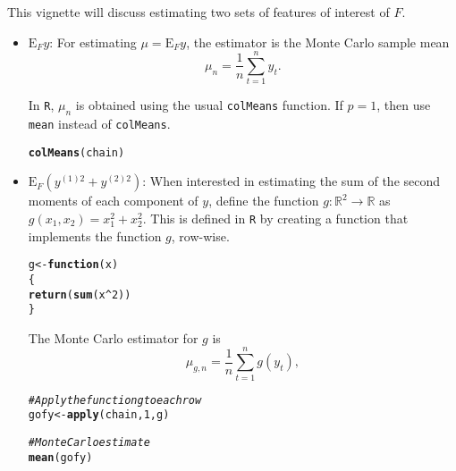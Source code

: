\documentclass[11pt]{article}\usepackage[]{graphicx}\usepackage[]{color}
\makeatletter
\newcommand{\hlnum}[1]{\textcolor[rgb]{0.686,0.059,0.569}{#1}}%
\newcommand{\hlcom}[1]{\textcolor[rgb]{0.678,0.584,0.686}{\textit{#1}}}%
\newcommand{\hlopt}[1]{\textcolor[rgb]{0,0,0}{#1}}%
\newcommand{\hlstd}[1]{\textcolor[rgb]{0.345,0.345,0.345}{#1}}%
\newcommand{\hlkwa}[1]{\textcolor[rgb]{0.161,0.373,0.58}{\textbf{#1}}}%
\newcommand{\hlkwb}[1]{\textcolor[rgb]{0.69,0.353,0.396}{#1}}%
\newcommand{\hlkwc}[1]{\textcolor[rgb]{0.333,0.667,0.333}{#1}}%
\newcommand{\hlkwd}[1]{\textcolor[rgb]{0.737,0.353,0.396}{\textbf{#1}}}%
\newenvironment{kframe}{%
 \def\at@end@of@kframe{}%
 \ifinner\ifhmode%
  \def\at@end@of@kframe{\end{minipage}}%
  \begin{minipage}{\columnwidth}%
 \fi\fi%
 \def\FrameCommand##1{\hskip\@totalleftmargin \hskip-\fboxsep
 \colorbox{shadecolor}{##1}\hskip-\fboxsep
     \hskip-\linewidth \hskip-\@totalleftmargin \hskip\columnwidth}%
 \MakeFramed {\advance\hsize-\width
   \@totalleftmargin\z@ \linewidth\hsize
   \@setminipage}}%
 {\par\unskip\endMakeFramed%
 \at@end@of@kframe}
\newenvironment{knitrout}{}{} %
\makeatother
\begin{document}
\bigskip
This vignette will discuss estimating two sets of features of interest of $F$.
\begin{itemize}
\item $\text{E}_F y$: For estimating $\mu = \text{E}_Fy$, the estimator is the Monte Carlo sample mean
\[ \mu_n = \dfrac{1}{n} \displaystyle \sum_{t=1}^{n} y_t.\]

In \texttt{R}, $\mu_n$ is obtained using the usual \texttt{colMeans} function. If $p = 1$, then use \texttt{mean} instead of \texttt{colMeans}.

\begin{knitrout}
\color{fgcolor}\begin{kframe}
\begin{alltt}
\hlkwd{colMeans}\hlstd{(chain)}
\end{alltt}


{\ttfamily\noindent\bfseries\color{errorcolor}{\#\# Error in is.data.frame(x): object 'chain' not found}}\end{kframe}
\end{knitrout}
  
\item $\text{E}_F \left(y^{(1)2} + y^{(2)2} \right)$: When interested in estimating the sum of the second moments of each component of $y$,  define the function $g: \mathbb{R}^2 \to \mathbb{R}$ as $g(x_1,x_2) = x_1^2 + x_2^2$. This is defined in \texttt{R} by creating a function that implements the function $g$, row-wise.

\begin{knitrout}
\color{fgcolor}\begin{kframe}
\begin{alltt}
\hlstd{g} \hlkwb{<-} \hlkwa{function}\hlstd{(}\hlkwc{x}\hlstd{)}
\hlstd{\{}
  \hlkwd{return}\hlstd{(}\hlkwd{sum}\hlstd{(x}\hlopt{^}\hlnum{2}\hlstd{))}
\hlstd{\}}
\end{alltt}
\end{kframe}
\end{knitrout}

The Monte Carlo estimator for $g$ is 
\[ \mu_{g,n} = \dfrac{1}{n} \displaystyle \sum_{t=1}^{n} g(y_t),\]

\begin{knitrout}
\color{fgcolor}\begin{kframe}
\begin{alltt}
\hlcom{# Apply the function g to each row}
\hlstd{gofy} \hlkwb{<-} \hlkwd{apply}\hlstd{(chain,} \hlnum{1}\hlstd{, g)}
\end{alltt}


{\ttfamily\noindent\bfseries\color{errorcolor}{\#\# Error in apply(chain, 1, g): object 'chain' not found}}\begin{alltt}
\hlcom{# Monte Carlo estimate}
\hlkwd{mean}\hlstd{(gofy)}
\end{alltt}


{\ttfamily\noindent\bfseries\color{errorcolor}{\#\# Error in mean(gofy): object 'gofy' not found}}\end{kframe}
\end{knitrout}
\end{itemize}
\end{document}
